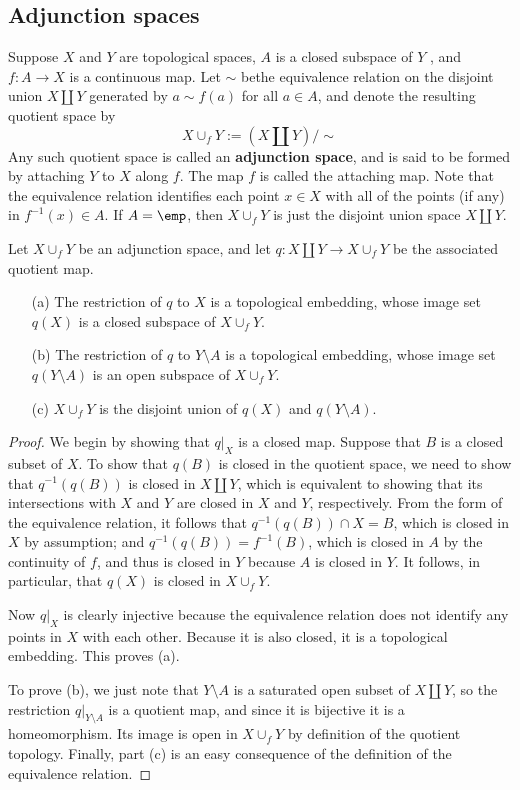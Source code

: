 \subsection{Adjunction spaces}
\begin{definition}
Suppose $X$ and $Y$ are topological spaces, $A$ is a closed subspace of $Y$ , and $f:A\to X$ is a continuous map. Let $\sim$ bethe equivalence relation on the disjoint union $X\amalg Y$ generated by $a\sim f(a)$ for all $a\in A$, and denote the resulting quotient space by
\[X\cup_{f}Y:=(X\amalg Y)/\text{$\sim$}\]
Any such quotient space is called an \textbf{adjunction space}, and is said to be formed by
attaching $Y$ to $X$ along $f$. The map $f$ is called the attaching map. Note that the
equivalence relation identifies each point $x\in X$ with all of the points (if any) in $f^{-1}(x)\in A$. If $A=\emp$, then $X\cup_{f} Y$ is just the disjoint union space $X\amalg Y$.
\end{definition}
\begin{theorem}\label{adjunction space prop}
Let $X\cup_{f}Y$ be an adjunction space, and let $q:X\amalg Y\to X\cup_{f}Y$ be the associated quotient map.
\begin{itemize}
\item[(a)] The restriction of $q$ to $X$ is a topological embedding, whose image set $q(X)$ is a closed subspace of $X\cup_{f}Y$.
\item[(b)] The restriction of $q$ to $Y\setminus A$ is a topological embedding, whose image set $q(Y\setminus A)$ is an open subspace of $X\cup_{f}Y$.
\item[(c)] $X\cup_{f}Y$ is the disjoint union of $q(X)$ and $q(Y\setminus A)$.
\end{itemize}
\end{theorem}
\begin{proof}
We begin by showing that $q|_X$ is a closed map. Suppose that $B$ is a closed subset of $X$. To show that $q(B)$ is closed in the quotient space, we need to show that $q^{-1}(q(B))$ is closed in $X\amalg Y$, which is equivalent to showing that its intersections with $X$ and $Y$ are closed in $X$ and $Y$, respectively. From the form of the equivalence relation, it follows that $q^{-1}(q(B))\cap X=B$, which is closed in $X$ by assumption; and $q^{-1}(q(B))=f^{-1}(B)$, which is closed in $A$ by the continuity of $f$, and thus is closed in $Y$ because $A$ is closed in $Y$. It follows, in particular, that $q(X)$ is closed in $X\cup_f Y$.\par
Now $q|_X$ is clearly injective because the equivalence relation does not identify any points in $X$ with each other. Because it is also closed, it is a topological embedding. This proves (a).\par
To prove (b), we just note that $Y\setminus A$ is a saturated open subset of $X\amalg Y$, so the restriction $q|_{Y\setminus A}$ is a quotient map, and since it is bijective it is a homeomorphism. Its image is open in $X\cup_f Y$ by definition of the quotient topology. Finally, part (c) is an easy consequence of the definition of the equivalence relation.
\end{proof}

